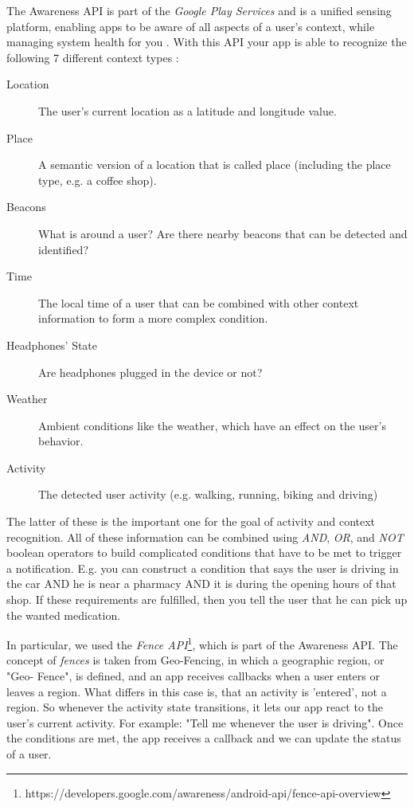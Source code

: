\documentclass{sigchi}
\begin{document}
The Awareness API is part of the \textit{Google Play Services} and is a unified sensing platform, enabling apps to be aware of all aspects of a user's context, while managing system health for you \cite{you16}. With this API your app is able to recognize the following 7 different context types \cite{goo16}:
\begin{description}
\item[Location]
The user's current location as a latitude and longitude value.
\item[Place]
A semantic version of a location that is called place (including the place type, e.g. a coffee shop).
\item[Beacons]
What is around a user? Are there nearby beacons that can be detected and identified?
\item[Time]
The local time of a user that can be combined with other context information to form a more complex condition.
\item[Headphones' State]
Are headphones plugged in the device or not?
\item[Weather]
Ambient conditions like the weather, which have an effect on the user's behavior.
\item[Activity]
The detected user activity (e.g. walking, running, biking and driving)
\end{description}

The latter of these is the important one for the goal of activity and context recognition. All of these information can be combined using \textit{AND}, \textit{OR}, and \textit{NOT} boolean operators to build complicated conditions that have to be met to trigger a notification. E.g. you can construct a condition that says the user is driving in the car AND he is near a pharmacy AND it is during the opening hours of that shop. If these requirements are fulfilled, then you tell the user that he can pick up the wanted medication.

In particular, we used the \textit{Fence API}\footnote{https://developers.google.com/awareness/android-api/fence-api-overview}, which is part of the Awareness API. The concept of \textit{fences} is taken from Geo-Fencing, in which a geographic region, or "Geo- Fence", is defined, and an app receives callbacks when a user enters or leaves a region. What differs in this case is, that an activity is 'entered', not a region. So whenever the activity state transitions, it lets our app react to the user's current activity. For example: "Tell me whenever the user is driving". Once the conditions are met, the app receives a callback and we can update the status of a user.
\end{document}
